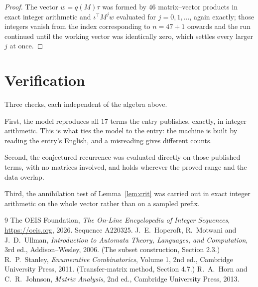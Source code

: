 \documentclass[11pt,a4paper]{article}
\theoremstyle{plain}
\theoremstyle{definition}
\begin{document}
\begin{proof}
The vector $w=q(M)\tau$ was formed by $46$ matrix--vector products in exact integer
arithmetic and $\iota^{\!\top}M^{j}w$ evaluated for $j=0,1,\dots$, again exactly; those
integers vanish from the index corresponding to $n=47+1$ onwards and the run continued
until the working vector was identically zero, which settles every larger $j$ at once.
\end{proof}

\section{Verification}

Three checks, each independent of the algebra above.

First, the model reproduces all $17$ terms the entry publishes, exactly, in integer
arithmetic. This is what ties the model to the entry: the machine is built by reading the
entry's English, and a misreading gives different counts.

Second, the conjectured recurrence was evaluated directly on those published terms, with no
matrices involved, and holds wherever the proved range and the data overlap.

Third, the annihilation test of Lemma~\ref{lem:crit} was carried out in exact integer
arithmetic on the whole vector rather than on a sampled prefix.

\begin{thebibliography}{9}
 The OEIS Foundation, \emph{The On-Line Encyclopedia of Integer
Sequences}, \url{https://oeis.org}, 2026. Sequence A220325.
 J.~E.~Hopcroft, R.~Motwani and J.~D.~Ullman, \emph{Introduction to Automata
Theory, Languages, and Computation}, 3rd ed., Addison--Wesley, 2006. (The subset
construction, Section 2.3.)
 R.~P.~Stanley, \emph{Enumerative Combinatorics}, Volume 1, 2nd ed.,
Cambridge University Press, 2011. (Transfer-matrix method, Section 4.7.)
 R.~A.~Horn and C.~R.~Johnson, \emph{Matrix Analysis}, 2nd ed., Cambridge
University Press, 2013.
\end{thebibliography}
\end{document}
